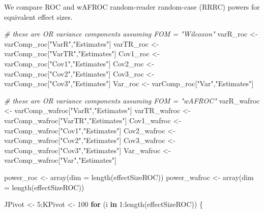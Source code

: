 \documentclass[
]{book}
\newenvironment{Shaded}{\begin{snugshade}}{\end{snugshade}}
\newcommand{\AttributeTok}[1]{\textcolor[rgb]{0.77,0.63,0.00}{#1}}
\newcommand{\CommentTok}[1]{\textcolor[rgb]{0.56,0.35,0.01}{\textit{#1}}}
\newcommand{\ControlFlowTok}[1]{\textcolor[rgb]{0.13,0.29,0.53}{\textbf{#1}}}
\newcommand{\DecValTok}[1]{\textcolor[rgb]{0.00,0.00,0.81}{#1}}
\newcommand{\FunctionTok}[1]{\textcolor[rgb]{0.00,0.00,0.00}{#1}}
\newcommand{\NormalTok}[1]{#1}
\newcommand{\OtherTok}[1]{\textcolor[rgb]{0.56,0.35,0.01}{#1}}
\newcommand{\SpecialCharTok}[1]{\textcolor[rgb]{0.00,0.00,0.00}{#1}}
\newcommand{\StringTok}[1]{\textcolor[rgb]{0.31,0.60,0.02}{#1}}
\begin{document}
We compare ROC and wAFROC random-reader random-case (RRRC) powers for equivalent effect sizes.

\begin{Shaded}
\begin{Highlighting}[numbers=left,,]
\CommentTok{\# these are OR variance components assuming FOM = "Wilcoxon"}
\NormalTok{varR\_roc }\OtherTok{\textless{}{-}}\NormalTok{ varComp\_roc[}\StringTok{"VarR"}\NormalTok{,}\StringTok{"Estimates"}\NormalTok{]}
\NormalTok{varTR\_roc }\OtherTok{\textless{}{-}}\NormalTok{ varComp\_roc[}\StringTok{"VarTR"}\NormalTok{,}\StringTok{"Estimates"}\NormalTok{]}
\NormalTok{Cov1\_roc }\OtherTok{\textless{}{-}}\NormalTok{ varComp\_roc[}\StringTok{"Cov1"}\NormalTok{,}\StringTok{"Estimates"}\NormalTok{]}
\NormalTok{Cov2\_roc }\OtherTok{\textless{}{-}}\NormalTok{ varComp\_roc[}\StringTok{"Cov2"}\NormalTok{,}\StringTok{"Estimates"}\NormalTok{]}
\NormalTok{Cov3\_roc }\OtherTok{\textless{}{-}}\NormalTok{ varComp\_roc[}\StringTok{"Cov3"}\NormalTok{,}\StringTok{"Estimates"}\NormalTok{]}
\NormalTok{Var\_roc }\OtherTok{\textless{}{-}}\NormalTok{ varComp\_roc[}\StringTok{"Var"}\NormalTok{,}\StringTok{"Estimates"}\NormalTok{]}

\CommentTok{\# these are OR variance components assuming FOM = "wAFROC"}
\NormalTok{varR\_wafroc }\OtherTok{\textless{}{-}}\NormalTok{ varComp\_wafroc[}\StringTok{"VarR"}\NormalTok{,}\StringTok{"Estimates"}\NormalTok{]}
\NormalTok{varTR\_wafroc }\OtherTok{\textless{}{-}}\NormalTok{ varComp\_wafroc[}\StringTok{"VarTR"}\NormalTok{,}\StringTok{"Estimates"}\NormalTok{]}
\NormalTok{Cov1\_wafroc }\OtherTok{\textless{}{-}}\NormalTok{ varComp\_wafroc[}\StringTok{"Cov1"}\NormalTok{,}\StringTok{"Estimates"}\NormalTok{]}
\NormalTok{Cov2\_wafroc }\OtherTok{\textless{}{-}}\NormalTok{ varComp\_wafroc[}\StringTok{"Cov2"}\NormalTok{,}\StringTok{"Estimates"}\NormalTok{]}
\NormalTok{Cov3\_wafroc }\OtherTok{\textless{}{-}}\NormalTok{ varComp\_wafroc[}\StringTok{"Cov3"}\NormalTok{,}\StringTok{"Estimates"}\NormalTok{]}
\NormalTok{Var\_wafroc }\OtherTok{\textless{}{-}}\NormalTok{ varComp\_wafroc[}\StringTok{"Var"}\NormalTok{,}\StringTok{"Estimates"}\NormalTok{]}

\NormalTok{power\_roc }\OtherTok{\textless{}{-}} \FunctionTok{array}\NormalTok{(}\AttributeTok{dim =} \FunctionTok{length}\NormalTok{(effectSizeROC))}
\NormalTok{power\_wafroc }\OtherTok{\textless{}{-}} \FunctionTok{array}\NormalTok{(}\AttributeTok{dim =} \FunctionTok{length}\NormalTok{(effectSizeROC))}

\NormalTok{JPivot }\OtherTok{\textless{}{-}} \DecValTok{5}\NormalTok{;KPivot }\OtherTok{\textless{}{-}} \DecValTok{100}
\ControlFlowTok{for}\NormalTok{ (i }\ControlFlowTok{in} \DecValTok{1}\SpecialCharTok{:}\FunctionTok{length}\NormalTok{(effectSizeROC)) \{}
  

\end{Highlighting}
\end{Shaded}
\end{document}
